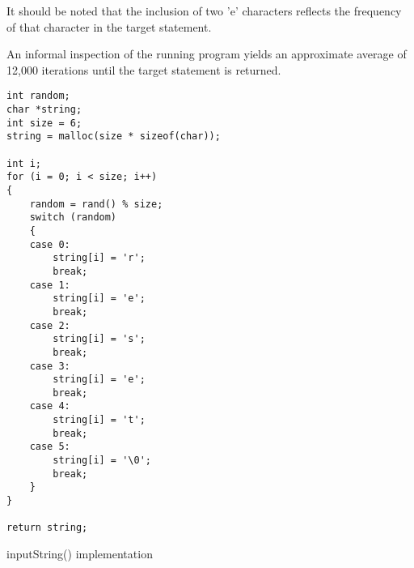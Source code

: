 \documentclass[11pt]{article}
\begin{document}
It should be noted that the inclusion of two 'e' characters reflects the frequency of that character in the target statement.

An informal inspection of the running program yields an approximate average of 12,000 iterations until the target statement is returned.

\begin{listing}[htbp]
\begin{verbatim}
int random;
char *string;
int size = 6;
string = malloc(size * sizeof(char));

int i;
for (i = 0; i < size; i++)
{
    random = rand() % size;
    switch (random)
    {
    case 0:
        string[i] = 'r';
        break;
    case 1:
        string[i] = 'e';
        break;
    case 2:
        string[i] = 's';
        break;
    case 3:
        string[i] = 'e';
        break;
    case 4:
        string[i] = 't';
        break;
    case 5:
        string[i] = '\0';
        break;
    }
}

return string;

\end{verbatim}
\caption{inputString() implementation}
\end{listing}
\end{document}
